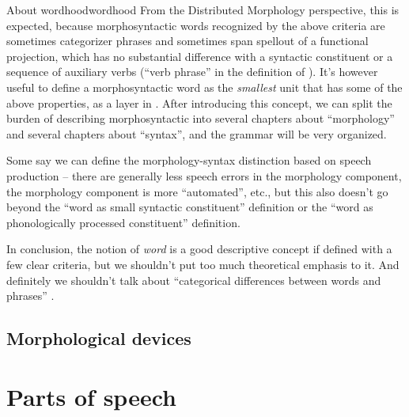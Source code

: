 \documentclass[UTF8, a4paper, oneside, scheme=plain]{ctexrep}
\newcommand*{\term}[1]{\emph{#1}}
\begin{document}
\begin{theorybox}{About wordhood}{wordhood}
    From the Distributed Morphology perspective,
    this is expected,
    because morphosyntactic words recognized by the above criteria 
    are sometimes categorizer phrases and sometimes span spellout of a functional projection,
    which has no substantial difference with a syntactic constituent or 
    a sequence of auxiliary verbs
    (``verb phrase'' in the definition of \citet{dixon2009basic1}).
    It's however useful to define a morphosyntactic word as the \emph{smallest} unit 
    that has some of the above properties,
    as a layer in .
    After introducing this concept,
    we can split the burden of describing morphosyntactic 
    into several chapters about ``morphology''
    and several chapters about ``syntax'',
    and the grammar will be very organized.

    Some say we can define the morphology-syntax distinction based on speech production -- 
    there are generally less speech errors in the morphology component,
    the morphology component is more ``automated'', etc.,
    but this also doesn't go beyond the ``word as small syntactic constituent'' definition 
    or the ``word as phonologically processed constituent'' definition.

    In conclusion, the notion of \term{word} is a good descriptive concept
    if defined with a few clear criteria,
    but we shouldn't put too much theoretical emphasis to it.
    And definitely we shouldn't talk about ``categorical differences between words and phrases'' 
    \citep{bruening2018lexicalist}.
\end{theorybox}

\subsection{Morphological devices}

\section{Parts of speech}
\end{document}
